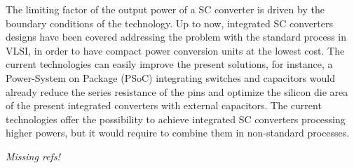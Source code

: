 The limiting factor of the output power of a SC converter is driven by the boundary conditions of the technology. Up to now, integrated SC converters designs have been covered addressing the problem with the standard process in VLSI, in order to have compact power conversion units at the lowest cost. The current technologies can easily improve the present solutions, for instance, a Power-System on Package (PSoC) integrating switches and capacitors would already reduce the series resistance of the pins and optimize the silicon die area of the present integrated converters with external capacitors. The current technologies offer the possibility to achieve integrated SC converters processing higher powers, but it would require to combine them in non-standard processes.

\emph{\color{red} Missing refs!}


%
% 